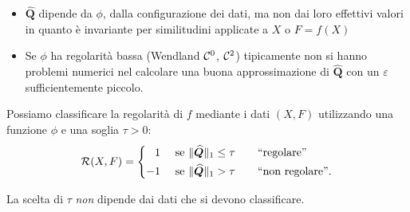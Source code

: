 \documentclass[10pt]{beamer}
\theoremstyle{definition}
\theoremstyle{plain}
\def\Cal#1{{\cal #1}}
\def\norm#1{\Vert #1\Vert}
\def\hbyw#1#2{\vbox to #1{\vfil \hbox to #2{\hfil}}}
\begin{document}
\begin{frame}
\begin{itemize}
\item $\widehat{\bm Q}$ dipende da $\phi$, dalla configurazione dei dati, ma non dai loro effettivi valori in quanto è invariante per similitudini applicate a $X$ o $F = f(X)$
\item Se $\phi$ ha regolarità bassa (Wendland $\Cal C^0$, $\Cal C^2$) tipicamente non si hanno problemi numerici nel calcolare una buona approssimazione di $\widehat{\bm Q}$ con un $\varepsilon$ sufficientemente piccolo.
\end{itemize}

\bigskip
Possiamo classificare la regolarità di $f$ mediante i dati $(X, F)$ utilizzando una funzione $\phi$ e una soglia $\tau>0$:
$$
\Cal R(X, F) = \begin{cases}
				\phantom{-}1& \text{ se $\norm{\widehat{\bm Q}}_1 \leq \tau$\qquad “regolare”} \\
				-1& \text{ se $\norm{\hbyw{3ex}{0em}\widehat{\bm Q}}_1 > \tau$\qquad “non regolare”}. 
			   \end{cases}
$$

La scelta di $\tau$  {\em non} dipende dai dati che si devono classificare.

\end{frame}



\end{document}
